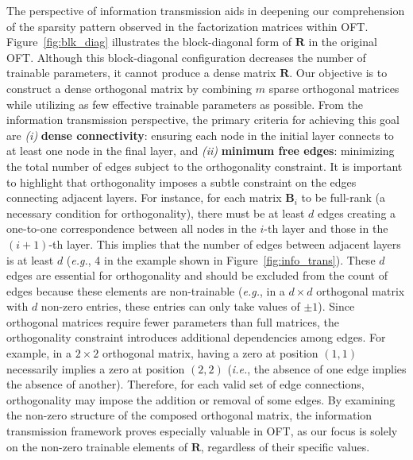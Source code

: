 The perspective of information transmission aids in deepening our comprehension of the sparsity pattern observed in the factorization matrices within OFT. Figure~\ref{fig:blk_diag} illustrates the block-diagonal form of $\bm{R}$ in the original OFT. Although this block-diagonal configuration decreases the number of trainable parameters, it cannot produce a dense matrix $\bm{R}$. Our objective is to construct a dense orthogonal matrix by combining $m$ sparse orthogonal matrices while utilizing as few effective trainable parameters as possible. From the information transmission perspective, the primary criteria for achieving this goal are \emph{(i)} \textbf{dense connectivity}: ensuring each node in the initial layer connects to at least one node in the final layer, and \emph{(ii)} \textbf{minimum free edges}: minimizing the total number of edges subject to the orthogonality constraint. It is important to highlight that orthogonality imposes a subtle constraint on the edges connecting adjacent layers. For instance, for each matrix $\bm{B}_i$ to be full-rank (a necessary condition for orthogonality), there must be at least $d$ edges creating a one-to-one correspondence between all nodes in the $i$-th layer and those in the $(i+1)$-th layer. This implies that the number of edges between adjacent layers is at least $d$ (\emph{e.g.}, 4 in the example shown in Figure~\ref{fig:info_trans}). These $d$ edges are essential for orthogonality and should be excluded from the count of edges because these elements are non-trainable (\emph{e.g.}, in a $d\times d$ orthogonal matrix with $d$ non-zero entries, these entries can only take values of $\pm 1$). Since orthogonal matrices require fewer parameters than full matrices, the orthogonality constraint introduces additional dependencies among edges. For example, in a $2\times 2$ orthogonal matrix, having a zero at position $(1,1)$ necessarily implies a zero at position $(2,2)$ (\emph{i.e.}, the absence of one edge implies the absence of another). Therefore, for each valid set of edge connections, orthogonality may impose the addition or removal of some edges. By examining the non-zero structure of the composed orthogonal matrix, the information transmission framework proves especially valuable in OFT, as our focus is solely on the non-zero trainable elements of $\bm{R}$, regardless of their specific values.

